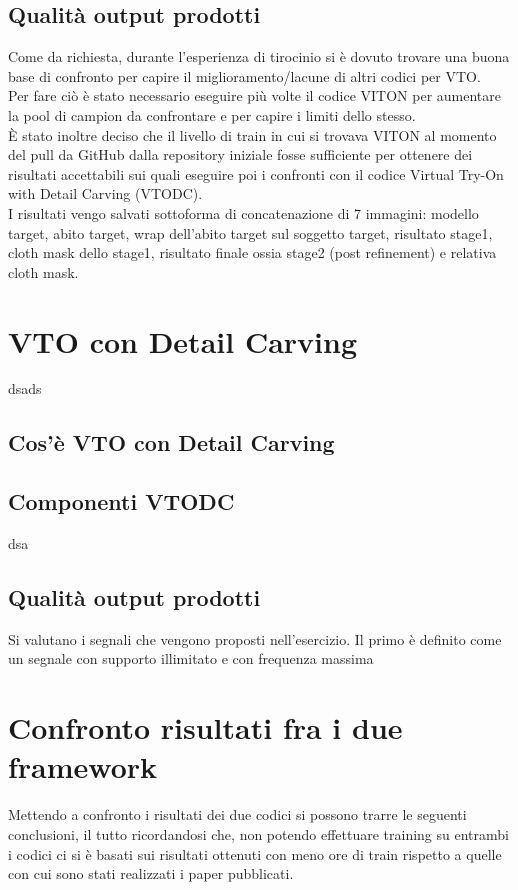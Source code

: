 \documentclass[final, 11pt]{article}
\begin{document}
	\subsection{Qualità output prodotti}
	Come da richiesta, durante l'esperienza di tirocinio si è dovuto trovare una buona base di confronto per capire il miglioramento/lacune di altri codici per VTO.\\Per fare ciò è stato necessario eseguire più volte il codice VITON per aumentare la pool di campion da confrontare e per capire i limiti dello stesso.\\
	È stato inoltre deciso che il livello di train in cui si trovava VITON al momento del pull da GitHub dalla repository iniziale fosse sufficiente per ottenere dei risultati accettabili sui quali eseguire poi i confronti con il codice Virtual Try-On with Detail Carving (VTODC).\\
	
	I risultati vengo salvati sottoforma di concatenazione di 7 immagini: modello target, abito target, wrap dell'abito target sul soggetto target, risultato stage1, cloth mask dello stage1, risultato finale ossia stage2 (post refinement) e relativa cloth mask.
	
	\section{VTO con Detail Carving}
	dsads
	\subsection{Cos'è VTO con Detail Carving}
	\subsection{Componenti VTODC}
	dsa
	\subsection{Qualità output prodotti}
	Si valutano i segnali che vengono proposti nell'esercizio. Il primo è definito come un segnale con supporto illimitato e con frequenza massima 
	
	\newpage
	\section{Confronto risultati fra i due framework}
	Mettendo a confronto i risultati dei due codici si possono trarre le seguenti conclusioni, il  tutto ricordandosi che, non potendo effettuare training su entrambi i codici ci si è basati sui risultati ottenuti con meno ore di train rispetto a quelle con cui sono stati realizzati i paper pubblicati.
	
\end{document}
